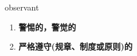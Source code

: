 
\begin{frame}
{\huge observant}
\begin{center}
\begin{enumerate}\Large
  \item \textbf{警惕的，警觉的}
  \item \textbf{严格遵守(规章、制度或原则)的}
\end{enumerate}
\end{center}
\end{frame}
